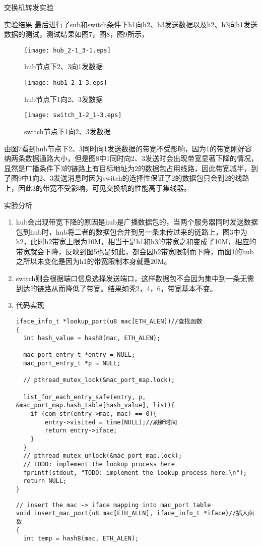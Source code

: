 \documentclass{article} %
\begin{document}
\begin{section}{交换机转发实验}
\begin{subsection}{实验结果}
		最后进行了sub和switch条件下h1向h2、h3发送数据以及h2、h3向h1发送数据的测试，测试结果如图7，图8，图9所示，
		\begin{figure}[hp]	
			\centering
			\texttt{[image: hub\_2-1\_3-1.eps]}	
			\caption{hub节点下2、3向1发数据}
		\end{figure}
		\begin{figure}[hp]	
			\centering
			\texttt{[image: hub1-2\_1-3.eps]}	
			\caption{hub节点下1向2、3发数据}
		\end{figure}
		\begin{figure}[h]	
			\centering
			\texttt{[image: switch\_1-2\_1-3.eps]}	
			\caption{switch节点下1向2、3发数据}
		\end{figure}
		由图7看到hub节点下2、3同时向1发送数据的带宽不受影响，因为1的带宽刚好容纳两条数据通路大小，但是图8中1同时向2、3发送时会出现带宽显著下降的情况，显然是广播条件下3的链路上有目标地址为2的数据包占用线路，因此带宽减半，到了图9中1向2、3发送消息时因为switch的选择性保证了2的数据包只会到2的线路上，因此3的带宽不受影响，可见交换机的性能高于集线器。\\
		\end{subsection}
		\begin{subsection}{实验分析}
			\begin{enumerate}[1)]
				\item hub会出现带宽下降的原因是hub是广播数据包的，当两个服务器同时发送数据包到hub时，hub将二者的数据包合并到另一条未传过来的链路上，图3中为h2，此时h2带宽上限为10M，相当于是h1和h3的带宽之和变成了10M，相应的带宽就会下降，反映到图5也是如此，都会因h2带宽限制而下降，而图1的hub之所以未变化是因为h1的带宽限制本身就是20M。
				\item switch则会根据端口信息选择发送端口，这样数据包不会因为集中到一条无需到达的链路从而降低了带宽。结果如秃2，4，6，带宽基本不变。
				\item 代码实现
					\begin{lstlisting}[language={[ANSI]C}]
iface_info_t *lookup_port(u8 mac[ETH_ALEN])//查找函数
{
  int hash_value = hash8(mac, ETH_ALEN);

  mac_port_entry_t *entry = NULL;
  mac_port_entry_t *p = NULL;

  // pthread_mutex_lock(&mac_port_map.lock);

  list_for_each_entry_safe(entry, p, &mac_port_map.hash_table[hash_value], list){
	if (com_str(entry->mac, mac) == 0){
		entry->visited = time(NULL);//刷新时间
		return entry->iface;
	}	
  }
  // pthread_mutex_unlock(&mac_port_map.lock);
  // TODO: implement the lookup process here
  fprintf(stdout, "TODO: implement the lookup process here.\n");
  return NULL;
}
					\end{lstlisting}
					\begin{lstlisting}[language={[ANSI]C}]
// insert the mac -> iface mapping into mac_port table
void insert_mac_port(u8 mac[ETH_ALEN], iface_info_t *iface)//插入函数
{
  int temp = hash8(mac, ETH_ALEN);


\end{lstlisting}
\end{enumerate}
\end{subsection}
\end{section}
\end{document}
